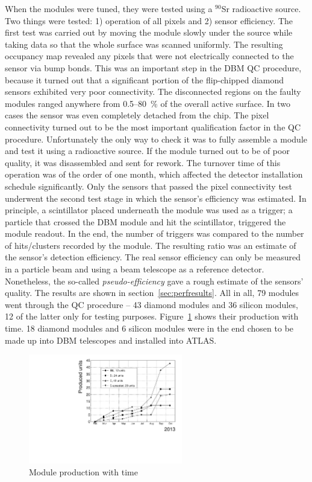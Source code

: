 \documentclass[12pt]{packages/mytustyle}  %
\begin{document}
When the modules were tuned, they were tested using a $^{90}$Sr radioactive source. Two things were tested: 1) operation of all pixels and 2) sensor efficiency. The first test was carried out by moving the module slowly under the source while taking data so that the whole surface was scanned uniformly. The resulting occupancy map revealed any pixels that were not electrically connected to the sensor via bump bonds. This was an important step in the DBM QC procedure, because it turned out that a significant portion of the flip-chipped diamond sensors exhibited very poor connectivity. The disconnected regions on the faulty modules ranged anywhere from 0.5--80~\% of the overall active surface. In two cases the sensor was even completely detached from the chip. The pixel connectivity turned out to be the most important qualification factor in the QC procedure. Unfortunately the only way to check it was to fully assemble a module and test it using a radioactive source. If the module turned out to be of poor quality, it was disassembled and sent for rework. The turnover time of this operation was of the order of one month, which affected the detector installation schedule significantly. Only the sensors that passed the pixel connectivity test underwent the second test stage in which the sensor's efficiency was estimated. In principle, a scintillator placed underneath the module was used as a trigger; a particle that crossed the DBM module and hit the scintillator, triggered the module readout. In the end, the number of triggers was compared to the number of hits/clusters recorded by the module. The resulting ratio was an estimate of the sensor's detection efficiency. The real sensor efficiency can only be measured in a particle beam and using a beam telescope as a reference detector. Nonetheless, the so-called \emph{pseudo-efficiency} gave a rough estimate of the sensors' quality. The results are shown in section~\ref{sec:perfresults}.  All in all, 79 modules went through the QC procedure -- 43 diamond modules and 36 silicon modules, 12 of the latter only for testing purposes. Figure~\ref{fig:production} shows their production with time. 18 diamond modules and 6 silicon modules were in the end chosen to be made up into DBM telescopes and installed into ATLAS.
\begin{figure}[!t]
\centering
\includegraphics[width=0.6\textwidth]{../../scripts/4_charge_monitoring/plots/production}
\caption{Module production with time}
\label{fig:production}
\end{figure}
\end{document}
